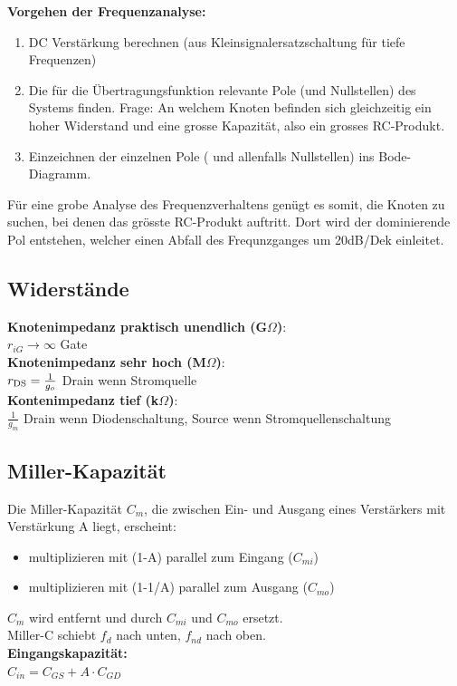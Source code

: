 \begin{minipage}{0.5\linewidth}
\textbf{Vorgehen der Frequenzanalyse:}
\begin{enumerate}[noitemsep,topsep=0pt]
    \item DC Verstärkung berechnen (aus Kleinsignalersatzschaltung für tiefe Frequenzen)
    \item Die für die Übertragungsfunktion relevante Pole (und Nullstellen) des Systems finden. Frage: An welchem Knoten befinden sich gleichzeitig ein hoher Widerstand und eine grosse Kapazität, also ein grosses RC-Produkt.
    \item Einzeichnen der einzelnen Pole ( und allenfalls Nullstellen) ins Bode-Diagramm.
\end{enumerate}
Für eine grobe Analyse des Frequenzverhaltens genügt es somit, die Knoten zu suchen, bei denen das grösste RC-Produkt auftritt. Dort wird der dominierende Pol entstehen, welcher einen Abfall des Frequnzganges um 20dB/Dek einleitet.
\subsection{Widerstände}
\textbf{Knotenimpedanz praktisch unendlich (G$\Omega$)}:\\ $r_{iG}\rightarrow \infty$ Gate\\
\textbf{Knotenimpedanz sehr hoch (M$\Omega$)}:\\ $r_{\rm DS} = \frac{1}{g_o}$ Drain wenn Stromquelle\\
\textbf{Kontenimpedanz tief (k$\Omega$)}:\\ $\frac{1}{g_m}$ Drain wenn Diodenschaltung, Source wenn Stromquellenschaltung
\end{minipage}
\begin{minipage}{0.5\linewidth}
\subsection{Miller-Kapazität}
Die Miller-Kapazität $C_m$, die zwischen Ein- und Ausgang eines Verstärkers mit Verstärkung A liegt, erscheint:
\begin{itemize}[noitemsep,topsep=0pt]
    \item multiplizieren mit (1-A) parallel zum Eingang ($C_{mi}$)
    \item multiplizieren mit (1-1/A) parallel zum Ausgang ($C_{mo}$)
\end{itemize}
$C_m$ wird entfernt und durch $C_{mi}$ und $C_{mo}$ ersetzt.\\
Miller-C schiebt $f_d$ nach unten, $f_{nd}$ nach oben.\vspace{5pt}\\
\textbf{Eingangskapazität:}\\
$C_{in} = C_{GS}+A\cdot C_{GD}$
\end{minipage}\hspace{5pt}%
